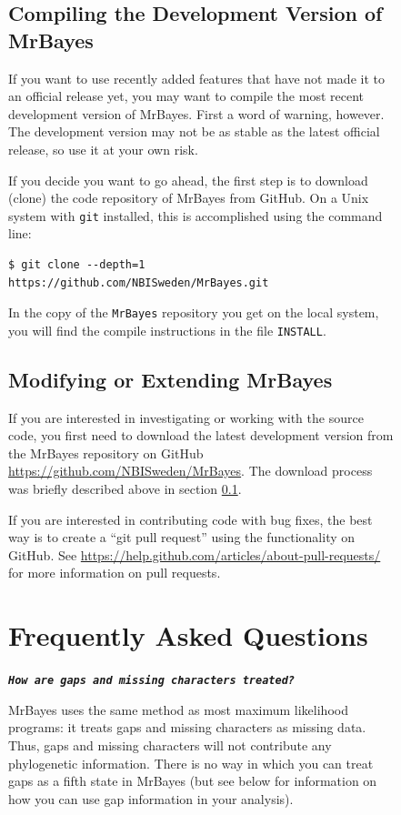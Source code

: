 \documentclass[12pt]{book}
\newcommand{\ttt}[1]{\texttt{#1}}
\newcommand{\tb}[1]{\ttt{\textbf{#1}}}
\begin{document}
\begin{figure}[h]
\subsection{Compiling the Development Version of MrBayes}
\label{compileDevVersion}

If you want to use recently added features that have not made it to an official release yet, you
may want to compile the most recent development version of MrBayes. First a word of warning,
however. The development version may not be as stable as the latest official release, so use it at
your own risk.

If you decide you want to go ahead, the first step is to download (clone) the code repository of
MrBayes from GitHub. On a Unix system with \ttt{git} installed, this is accomplished using the
command line:

\begin{verbatim}
$ git clone --depth=1 https://github.com/NBISweden/MrBayes.git
\end{verbatim}

In the copy of the \ttt{MrBayes} repository you get on the local system, you will find the compile
instructions in the file \ttt{INSTALL}.

\subsection{Modifying or Extending MrBayes}

If you are interested in investigating or working with the source code, you first need to download
the latest development version from the MrBayes repository on GitHub
\url{https://github.com/NBISweden/MrBayes}. The download process was briefly described above in
section \ref{compileDevVersion}.

If you are interested in contributing code with bug fixes, the best way is to create a ``git pull
request'' using the functionality on GitHub. See
\url{https://help.github.com/articles/about-pull-requests/} for more information on pull requests.


\section{Frequently Asked Questions}
\label{FAQ}

\tb{\it{How are gaps and missing characters treated?}}

MrBayes uses the same method as most maximum likelihood programs: it treats gaps and missing
characters as missing data. Thus, gaps and missing characters will not contribute any phylogenetic
information. There is no way in which you can treat gaps as a fifth state in MrBayes (but see below
for information on how you can use gap information in your analysis).


\end{figure}
\end{document}
